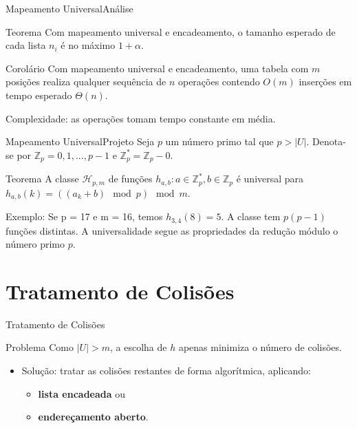\documentclass[aspectratio=169]{beamer}
\begin{document}
\begin{frame}{Mapeamento Universal}{Análise}
\begin{block}{Teorema}
Com mapeamento universal e encadeamento, o tamanho esperado de cada lista $n_i$ é no máximo $1 + \alpha$.
\end{block}
\begin{block}{Corolário}
Com mapeamento universal e encadeamento, uma tabela com $m$ posições realiza qualquer sequência de $n$ operações contendo $O(m)$ inserções em tempo esperado $\Theta(n)$.
\end{block}
{\color{red}Complexidade}: as operações tomam tempo constante em média.
\end{frame}

\begin{frame}{Mapeamento Universal}{Projeto}
Seja $p$ um número primo tal que $p > |U|$. Denota-se por $\mathbb{Z}_p = {0, 1, . . . , p - 1}$ e $\mathbb{Z}_p^{*} = \mathbb{Z}_p - {0}$.
\begin{block}{Teorema}
A classe $\mathcal{H}_{p,m}$ de funções ${h_{a,b} : a \in \mathbb{Z}_p^{*} , b \in \mathbb{Z}_p }$ é universal para $h_{a,b} (k) = ((a_k + b) \mod p) \mod m$.
\end{block}
{\color{red}Exemplo}: Se p = 17 e m = 16, temos $h_{3,4} (8) = 5$.
A classe tem $p(p - 1)$ funções distintas. A universalidade segue as propriedades da redução módulo o número primo $p$.%
\end{frame}

\section{Tratamento de Colisões}

\begin{frame}{Tratamento de Colisões}
\begin{block}{Problema}
Como $|U| > m$, a escolha de $h$ apenas minimiza o número de colisões.
\end{block}
\begin{itemize}
 \item {\color{red} Solução}: tratar as colisões restantes de forma algorítmica, aplicando:
 \begin{itemize}
 \item {\bf lista encadeada} ou
 \item {\bf endereçamento aberto}.
 \end{itemize}
\end{itemize}
\end{frame}
\end{document}
